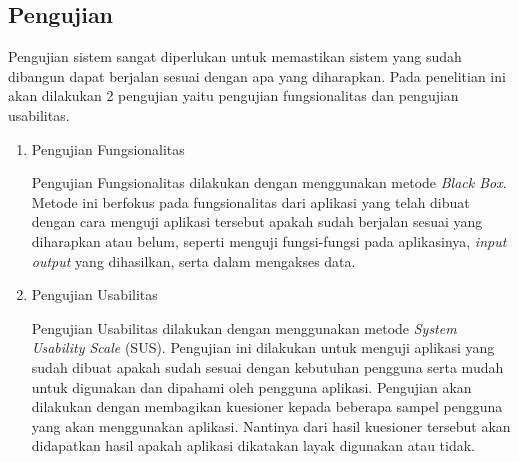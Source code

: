\subsection{Pengujian}
Pengujian sistem sangat diperlukan untuk memastikan sistem yang sudah dibangun dapat berjalan sesuai dengan apa yang diharapkan. Pada penelitian ini akan dilakukan 2 pengujian yaitu pengujian fungsionalitas dan pengujian usabilitas.

\begin{enumerate}
\item Pengujian Fungsionalitas
\par Pengujian Fungsionalitas dilakukan dengan menggunakan metode \textit{Black Box}. Metode ini berfokus pada fungsionalitas dari aplikasi yang telah dibuat dengan cara menguji aplikasi tersebut apakah sudah berjalan sesuai yang diharapkan atau belum, seperti menguji fungsi-fungsi pada aplikasinya, \textit{input output} yang dihasilkan, serta dalam mengakses data.
\item Pengujian Usabilitas
\par Pengujian Usabilitas dilakukan dengan menggunakan metode \textit{System Usability Scale} (SUS). Pengujian ini dilakukan untuk menguji aplikasi yang sudah dibuat apakah sudah sesuai dengan kebutuhan pengguna serta mudah untuk digunakan dan dipahami oleh pengguna aplikasi. Pengujian akan dilakukan dengan membagikan kuesioner kepada beberapa sampel pengguna yang akan menggunakan aplikasi. Nantinya dari hasil kuesioner tersebut akan didapatkan hasil apakah aplikasi dikatakan layak digunakan atau tidak. 
\end{enumerate}


